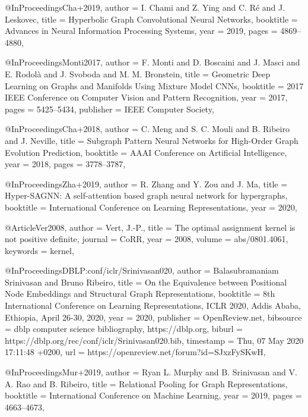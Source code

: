 @InProceedings{Cha+2019,
  author    = {I. Chami and Z. Ying and C. R{\'{e}} and J. Leskovec},
  title     = {Hyperbolic Graph Convolutional Neural Networks},
  booktitle = {Advances in Neural Information Processing Systems},
  year      = {2019},
  pages     = {4869--4880},
}

@InProceedings{Monti2017,
  author    = {F. Monti and D. Boscaini and J. Masci and E. Rodol{\`{a}} and J. Svoboda and M. M. Bronstein},
  title     = {Geometric Deep Learning on Graphs and Manifolds Using Mixture Model CNNs},
  booktitle = {2017 {IEEE} Conference on Computer Vision and Pattern Recognition},
  year      = {2017},
  pages     = {5425--5434},
  publisher = {{IEEE} Computer Society},
}

@InProceedings{Cha+2018,
  author    = {C. Meng and S. C. Mouli and B. Ribeiro and J. Neville},
  title     = {Subgraph Pattern Neural Networks for High-Order Graph Evolution Prediction},
  booktitle = {{AAAI} Conference on Artificial Intelligence},
  year      = {2018},
  pages     = {3778--3787},
}

@InProceedings{Zha+2019,
  author    = {R. Zhang and Y. Zou and J. Ma},
  title     = {{Hyper-SAGNN:} {A} self-attention based graph neural network for hypergraphs},
  booktitle = {International Conference on Learning Representations},
  year      = {2020},
}

@Article{Ver2008,
  author   = {Vert, J.{-}P.},
  title    = {The optimal assignment kernel is not positive definite},
  journal  = {CoRR},
  year     = {2008},
  volume   = {abs/0801.4061},
  keywords = {kernel},
}

@InProceedings{DBLP:conf/iclr/Srinivasan020,
  author    = {Balasubramaniam Srinivasan and Bruno Ribeiro},
  title     = {On the Equivalence between Positional Node Embeddings and Structural Graph Representations},
  booktitle = {8th International Conference on Learning Representations, {ICLR} 2020, Addis Ababa, Ethiopia, April 26-30, 2020},
  year      = {2020},
  publisher = {OpenReview.net},
  bibsource = {dblp computer science bibliography, https://dblp.org},
  biburl    = {https://dblp.org/rec/conf/iclr/Srinivasan020.bib},
  timestamp = {Thu, 07 May 2020 17:11:48 +0200},
  url       = {https://openreview.net/forum?id=SJxzFySKwH},
}

@InProceedings{Mur+2019,
  author    = {Ryan L. Murphy and B. Srinivasan and V. A. Rao and B. Ribeiro},
  title     = {Relational Pooling for Graph Representations},
  booktitle = {International Conference on Machine Learning},
  year      = {2019},
  pages     = {4663--4673},
}

